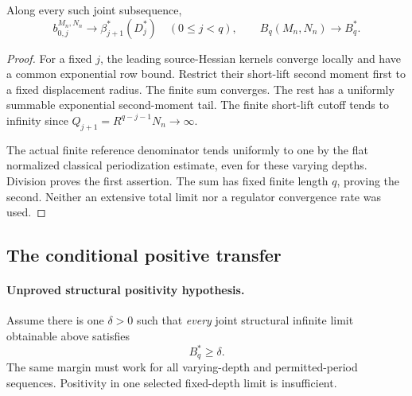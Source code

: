 \begin{lemma}
\label{fbt-moment-lemma}
Along every such joint subsequence,
\begin{equation}
 b_{0,j}^{M_n,N_n}\longrightarrow
                      \beta_{j+1}^*(D_j^*)\quad(0\le j<q),
 \qquad
 B_q(M_n,N_n)\longrightarrow B_q^*.
 \label{fbt-moment-limits}
\end{equation}
\end{lemma}
\begin{proof}
For a fixed \(j\), the leading source-Hessian kernels
converge locally and have a common exponential row
bound. Restrict their short-lift second moment first
to a fixed displacement radius. The finite sum converges.
The rest has a uniformly summable exponential
second-moment tail. The finite short-lift cutoff tends
to infinity since \(Q_{j+1}=R^{q-j-1}N_n\to\infty\).

The actual finite reference denominator tends uniformly
to one by the flat normalized classical periodization
estimate, even for these varying depths. Division proves
the first assertion. The sum has fixed finite length
\(q\), proving the second. Neither an extensive total
limit nor a regulator convergence rate was used.
\end{proof}

\subsection{The conditional positive transfer}
\label{fbt-positive-section}

\paragraph{Unproved structural positivity hypothesis.}
Assume there is one \(\delta>0\) such that \emph{every}
joint structural infinite limit obtainable above satisfies
\begin{equation}
                                  B_q^*\ge\delta.
 \label{fbt-positive-hypothesis}
\end{equation}
The same margin must work for all varying-depth and
permitted-period sequences. Positivity in one selected
fixed-depth limit is insufficient.

